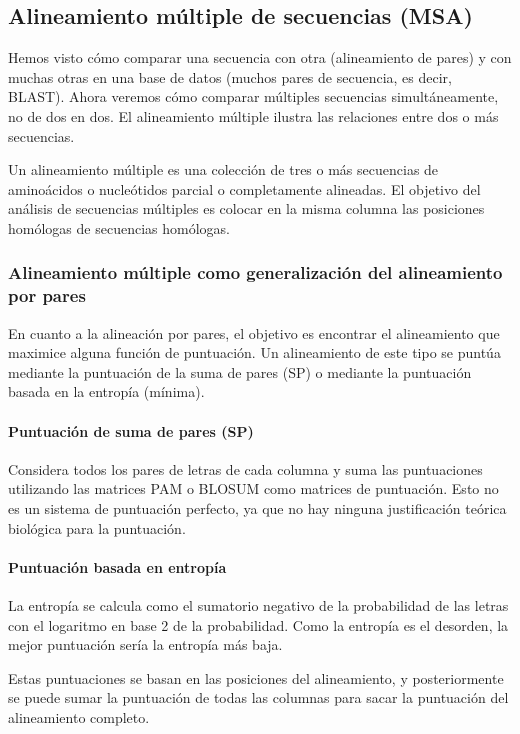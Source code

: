 \subsection{Alineamiento múltiple de secuencias (MSA)}
Hemos visto cómo comparar una secuencia con otra (alineamiento de pares) y con muchas otras en una base de datos (muchos pares de secuencia, es decir, BLAST). Ahora veremos cómo comparar múltiples secuencias simultáneamente, no de dos en dos. El alineamiento múltiple ilustra las relaciones entre dos o más secuencias.

Un alineamiento múltiple es una colección de tres o más secuencias de aminoácidos o nucleótidos parcial o completamente alineadas. El objetivo del análisis de secuencias múltiples es colocar en la misma columna las posiciones homólogas de secuencias homólogas.

\subsubsection{Alineamiento múltiple como generalización del alineamiento por pares}
En cuanto a la alineación por pares, el objetivo es encontrar el alineamiento que maximice alguna función de puntuación. Un alineamiento de este tipo se puntúa mediante la puntuación de la suma de pares (SP) o mediante la puntuación basada en la entropía (mínima).

\paragraph{Puntuación de suma de pares (SP)}
Considera todos los pares de letras de cada columna y suma las puntuaciones utilizando las matrices PAM o BLOSUM como matrices de puntuación. Esto no es un sistema de puntuación perfecto, ya que no hay ninguna justificación teórica biológica para la puntuación. 

\paragraph{Puntuación basada en entropía}
La entropía se calcula como el sumatorio negativo de la probabilidad de las letras con el logaritmo en base 2 de la probabilidad. Como la entropía es el desorden, la mejor puntuación sería la entropía más baja.

Estas puntuaciones se basan en las posiciones del alineamiento, y posteriormente se puede sumar la puntuación de todas las columnas para sacar la puntuación del alineamiento completo. 

